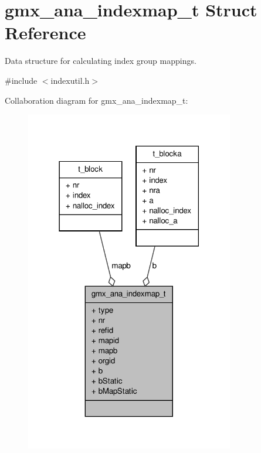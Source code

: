 \hypertarget{structgmx__ana__indexmap__t}{\section{gmx\-\_\-ana\-\_\-indexmap\-\_\-t \-Struct \-Reference}
\label{structgmx__ana__indexmap__t}
}


\-Data structure for calculating index group mappings.  




{\ttfamily \#include $<$indexutil.\-h$>$}



\-Collaboration diagram for gmx\-\_\-ana\-\_\-indexmap\-\_\-t\-:
\nopagebreak
\begin{figure}[H]
\begin{center}
\leavevmode
\includegraphics[width=258pt]{structgmx__ana__indexmap__t__coll__graph}
\end{center}
\end{figure}
